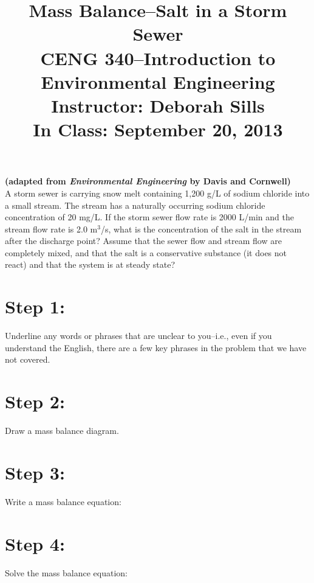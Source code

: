 \documentclass[11pt,letterpaper]{article}
\begin{document}
\setlength{\parindent}{0cm} 



\frenchspacing

\setlength{\textwidth}{6.25in}

\title {\Large{\textbf{Mass Balance--Salt in a Storm Sewer}}\\ \large{CENG 340--Introduction to Environmental Engineering\\
Instructor: Deborah Sills\\ \textbf{In Class: September 20, 2013}}}

\author {}
\date {}
\maketitle

\vspace{-1.5cm}


\textbf{(adapted from \emph{Environmental Engineering} by Davis and Cornwell)}\\
A storm sewer is carrying snow melt containing 1,200 g/L of sodium chloride into a small stream.  The stream has a naturally occurring sodium chloride concentration of 20 mg/L.  If the storm sewer flow rate is 2000 L/min and the stream flow rate is 2.0 m$^3$/s, what is the concentration of the salt in the stream after the discharge point?  Assume that the sewer flow and stream flow are completely mixed, and that the salt is a conservative substance (it does not react) and that the system is at steady state?

\section *{Step 1:} 
Underline any words or phrases that are unclear to you--i.e., even if you understand the English, there are a few key phrases in the problem that we have not covered.

\vspace{1in}

\section *{Step 2:} 
Draw a mass balance diagram.

\vspace{2in}

\section *{Step 3:}
Write a mass balance equation:

\pagebreak
\section *{Step 4:} 
Solve the mass balance equation:
\end{document}
